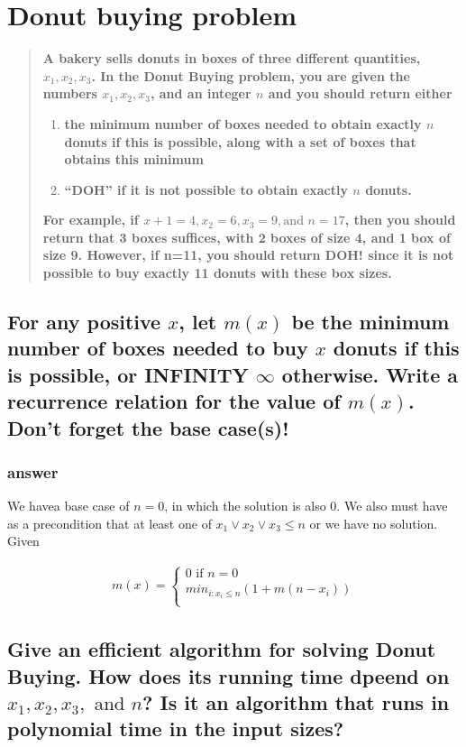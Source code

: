 \documentclass[titlepage]{article}\usepackage[]{graphicx}\usepackage[]{color}
\begin{document}
\section{Donut buying problem}
\begin{quote}
	\textbf{A bakery sells donuts in boxes of three different quantities, $x_1, x_2,
		x_3$. In the Donut Buying problem, you are given the numbers $x_1, x_2,
		x_3$, and an integer $n$ and you should return either }
	\begin{enumerate}
		\item \textbf{the minimum number of boxes needed to obtain exactly $n$ donuts if
			this is possible, along with a set of boxes that obtains this minimum}
		\item \textbf{``DOH'' if it is not possible to obtain exactly $n$ donuts. }
	\end{enumerate}
	\textbf{For example, if $x+1 = 4, x_2 =6, x_3 = 9, \text{and } n=17$, then you should
	return that 3 boxes suffices, with 2 boxes of size 4, and 1 box of size 9.
	However, if n=11, you should return DOH! since it is not possible to buy
exactly 11 donuts with these box sizes. }
\end{quote}

\subsection{For any positive $x$, let $m(x)$ be the minimum number of boxes
  needed to buy $x$ donuts if this is possible, or INFINITY $\infty$
  otherwise. Write a recurrence relation for the value of $m(x)$. Don't forget
the base case(s)!}

\subsubsection{answer}
We havea base case of $n=0$, in which the solution is also 0. We also must have
as a precondition that at least one of $x_1 \lor x_2 \lor x_3 \leq n $ or we have
no solution. Given

\begin{align*}
	m(x) = \begin{cases}
		0 \text{ if } n = 0 \\
		min_{i:x_i \leq n} \left(1 + m(n - x_i)\right) \\
	\end{cases}
\end{align*}



\subsection{ Give an efficient algorithm for solving Donut Buying. How does its
  running time dpeend on $x_1, x_2, x_3,\text{ and } n$? Is it an algorithm
that runs in polynomial time in the input sizes?} 
\end{document}
